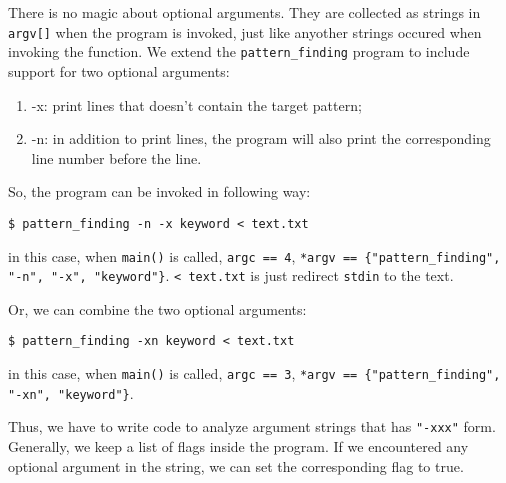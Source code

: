 \documentclass[11pt]{article}
\begin{document}
There is no magic about optional arguments. They are collected as strings in \texttt{argv[]} when the program is invoked, just like anyother strings occured when invoking the function. We extend the \texttt{pattern\_finding} program to include support for two optional arguments:
\begin{enumerate}
\item -x: print lines that doesn't contain the target pattern;
\item -n: in addition to print lines, the program will also print the corresponding line number before the line.
\end{enumerate}
So, the program can be invoked in following way:
\begin{Verbatim}[frame=single]
$ pattern_finding -n -x keyword < text.txt
\end{Verbatim}
in this case, when \texttt{main()} is called, \texttt{argc == 4}, \texttt{*argv == \{"pattern\_finding", "-n", "-x", "keyword"\}}. \texttt{< text.txt} is just redirect \texttt{stdin} to the text.

Or, we can combine the two optional arguments:
\begin{Verbatim}[frame=single]
$ pattern_finding -xn keyword < text.txt
\end{Verbatim}
in this case, when \texttt{main()} is called, \texttt{argc == 3}, \texttt{*argv == \{"pattern\_finding", "-xn", "keyword"\}}.

Thus, we have to write code to analyze argument strings that has \texttt{"-xxx"} form. Generally, we keep a list of flags inside the program. If we encountered any optional argument in the string, we can set the corresponding flag to true.
\end{document}
